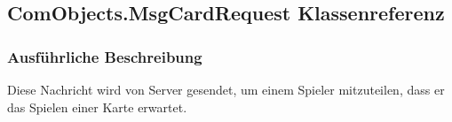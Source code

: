 \hypertarget{a00058}{\subsection{Com\-Objects.\-Msg\-Card\-Request Klassenreferenz}
\label{a00058}
}


\subsubsection{Ausführliche Beschreibung}
Diese Nachricht wird von Server gesendet, um einem Spieler mitzuteilen, dass er das Spielen einer Karte erwartet. 